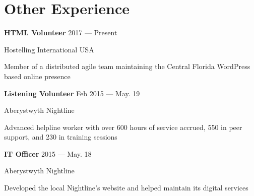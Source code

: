 \section{Other Experience}

\parbox[t][][t]{\linewidth}{
	\parbox{\linewidth}{\textbf{HTML Volunteer} \hfill {{2017 --- Present}}}
	\parbox{\linewidth}{Hostelling International USA}
	\smallbreak
	\smallskip
	Member of a distributed agile team maintaining the Central Florida WordPress based online presence
	\bigbreak
	\smallskip
}

\parbox[t][][t]{\linewidth}{
	\parbox{\linewidth}{\textbf{Listening Volunteer} \hfill {{Feb 2015 --- May. 19}}}
	\parbox{\linewidth}{Aberystwyth Nightline}
	\smallbreak
	\smallskip
	Advanced helpline worker with over 600 hours of service accrued, 550 in peer support, and 230 in training sessions
	\bigbreak
	\smallskip
}

\parbox[t][][t]{\linewidth}{
	\parbox{\linewidth}{\textbf{IT Officer} \hfill {{2015 --- May. 18}}}
	\parbox{\linewidth}{Aberystwyth Nightline}
	\smallbreak
	\smallskip
	Developed the local Nightline's website and helped maintain its digital services
}